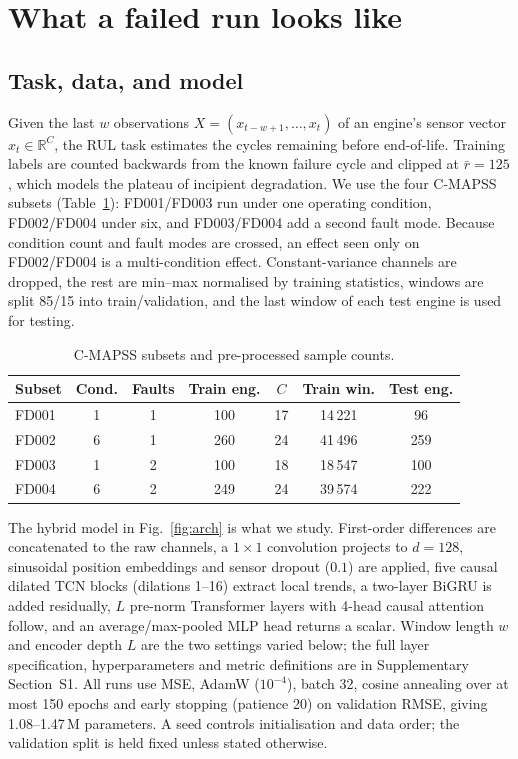 \section{What a failed run looks like}
\label{sec:phenomenon}

\subsection{Task, data, and model}
\label{sec:phenomenon_arch}

Given the last $w$ observations $X=(x_{t-w+1},\dots,x_t)$ of an engine's
sensor vector $x_t\in\mathbb{R}^{C}$, the RUL task estimates the cycles
remaining before end-of-life. Training labels are counted backwards from the
known failure cycle and clipped at $\bar r=125$, which models the plateau of
incipient degradation. We use the four C-MAPSS subsets
(Table~\ref{tab:datasets}): FD001/FD003 run under one operating condition,
FD002/FD004 under six, and FD003/FD004 add a second fault mode. Because
condition count and fault modes are crossed, an effect seen only on
FD002/FD004 is a multi-condition effect. Constant-variance channels are
dropped, the rest are min--max normalised by training statistics, windows are
split 85/15 into train/validation, and the last window of each test engine is
used for testing.

\begin{table}[t]
\centering\footnotesize
\caption{C-MAPSS subsets and pre-processed sample counts.}
\label{tab:datasets}
\begin{tabularx}{\linewidth}{Xcccccc}
\toprule
Subset & Cond. & Faults & Train eng. & $C$ & Train win. & Test eng. \\
\midrule
FD001 & 1 & 1 & 100 & 17 & 14\,221 & 96 \\
FD002 & 6 & 1 & 260 & 24 & 41\,496 & 259 \\
FD003 & 1 & 2 & 100 & 18 & 18\,547 & 100 \\
FD004 & 6 & 2 & 249 & 24 & 39\,574 & 222 \\
\bottomrule
\end{tabularx}
\end{table}

The hybrid model in Fig.~\ref{fig:arch} is what we study. First-order
differences are concatenated to the raw channels, a $1{\times}1$ convolution
projects to $d=128$, sinusoidal position embeddings and sensor dropout
($0.1$) are applied, five causal dilated TCN blocks (dilations 1--16)
extract local trends, a two-layer BiGRU is added residually, $L$ pre-norm
Transformer layers with 4-head causal attention follow, and an
average/max-pooled MLP head returns a scalar. Window length $w$ and encoder
depth $L$ are the two settings varied below; the full layer specification,
hyperparameters and metric definitions are in Supplementary Section~S1. All
runs use MSE, AdamW ($10^{-4}$), batch 32, cosine annealing over at most 150
epochs and early stopping (patience 20) on validation RMSE, giving
1.08--1.47\,M parameters. A seed controls initialisation and data order; the
validation split is held fixed unless stated otherwise.

